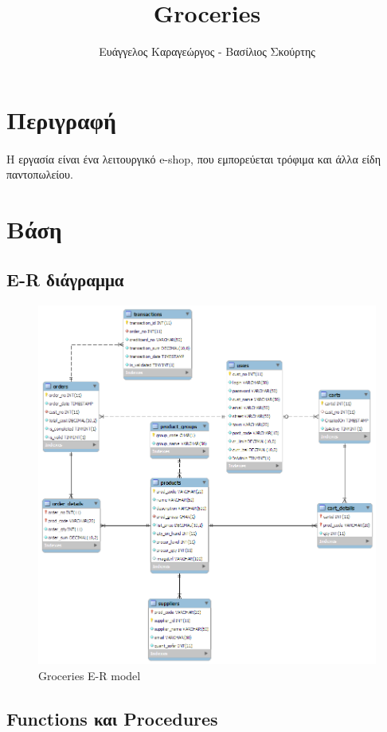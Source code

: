 \documentclass[12pt]{article}
\title{Groceries}
\author{Ευάγγελος Καραγεώργος - Βασίλιος Σκούρτης }
\date{}
\begin{document}
  \maketitle
  \section{Περιγραφή}
  	\paragraph{}
  	  Η εργασία είναι ένα λειτουργικό e-shop, που εμπορεύεται τρόφιμα και άλλα είδη παντοπωλείου.
  	  \par 
  \section{Βάση}
  	\subsection{E-R διάγραμμα}
		\begin{figure}[H]
			\centering
			\includegraphics[width=1\textwidth]{ER_model}
			\caption{Groceries E-R model}
		\end{figure}
	\pagebreak
	\subsection{Functions και Procedures}
\end{document}
